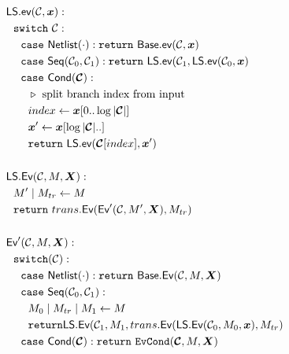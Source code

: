 \begin{figure}
  \begin{adjustwidth}{-0.1\textwidth}{-0.1\textwidth}
  \centering
  \begin{minipage}[t]{0.56\linewidth}
    \vspace{0pt}
    \begin{align*}
      &\ourscheme.\gev(\cir, \cirinp):\\
      &~~\switch~\cir:\\
      &~~~~\ccase~\netlist(\cdot): \creturn~\underscheme.\gev(\cir, \cirinp)\\
      &~~~~\ccase~\sequential(\cir_0, \cir_1): \creturn~\ourscheme.\gev(\cir_1, \ourscheme.\gev(\cir_0, \cirinp)\\
      &~~~~\ccase~\conditional(\vec{\cir}):\\
      &~~~~~~\codecomment{split branch index from input}\\
      &~~~~~~index \gets \cirinp[0..\log |\vec \cir|]\\
      &~~~~~~\cirinp' \gets \cirinp[\log |\vec \cir|..]\\
      &~~~~~~\creturn~\ourscheme.\gev(\vec{\cir}[index], \cirinp')\\
      \\
      &\ourscheme.\gEv(\cir,\mat,\gcirinp):\\
      &~~\mat'\mid \mat_{tr} \gets \mat\\
      &~~\creturn~\evtranslate(\gEv'(\cir,\mat',\gcirinp), \mat_{tr})\\
      \\
      &\gEv'(\cir,\mat,\gcirinp):\\
      &~~\switch(\cir):\\
      &~~~~\ccase~\netlist(\cdot): \creturn~\underscheme.\gEv(\cir,\mat,\gcirinp)\\
      &~~~~\ccase~\sequential(\cir_0, \cir_1): \\
      &~~~~~~\mat_0\mid\mat_{tr}\mid\mat_1 \gets \mat\\
      &~~~~~~\creturn \ourscheme.\gEv(\cir_1, \mat_1, \evtranslate(\ourscheme.\gEv(\cir_0, \mat_0, \cirinp), \mat_{tr})\\
      &~~~~\ccase~\conditional(\vec \cir): \creturn~\evcond(\vec \cir, \mat, \gcirinp)
    \end{align*}
  \end{minipage}
  \begin{minipage}[t]{0.40\linewidth}
    \vspace{0pt}
    \begin{align*}

\end{align*}
\end{minipage}
\end{adjustwidth}
\end{figure}
